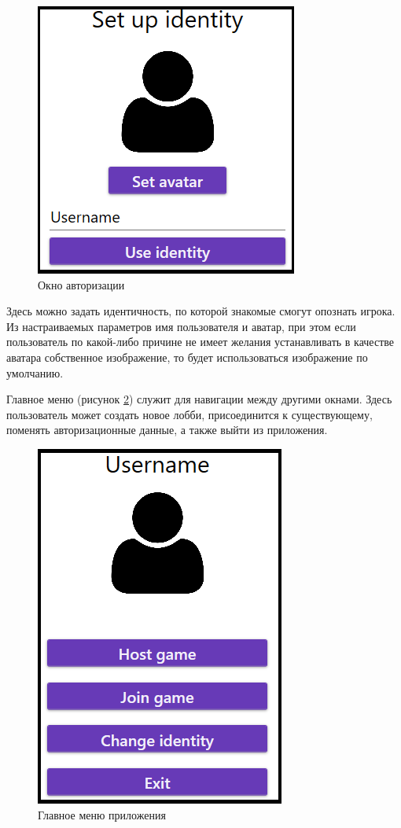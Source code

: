 \begin{figure}[!ht]
    \centering
    \includegraphics[scale=1]{attachments/identity_ui.png}
    \caption{Окно авторизации}
    \label{sec:manual:identity_ui}
\end{figure}

Здесь можно задать идентичность, по которой знакомые смогут опознать игрока. Из настраиваемых параметров имя пользователя и аватар, при этом если пользователь по какой-либо
причине не имеет желания устанавливать в качестве аватара собственное изображение, то будет использоваться изображение по умолчанию.

Главное меню (рисунок \ref{sec:manual:menu_ui}) служит для навигации между другими окнами. Здесь пользователь может создать новое лобби, присоединится к существующему, поменять авторизационные данные, а
также выйти из приложения.

\begin{figure}[!ht]
    \centering
    \includegraphics[scale=0.8]{attachments/menu_ui.png}
    \caption{Главное меню приложения}
    \label{sec:manual:menu_ui}
\end{figure}

